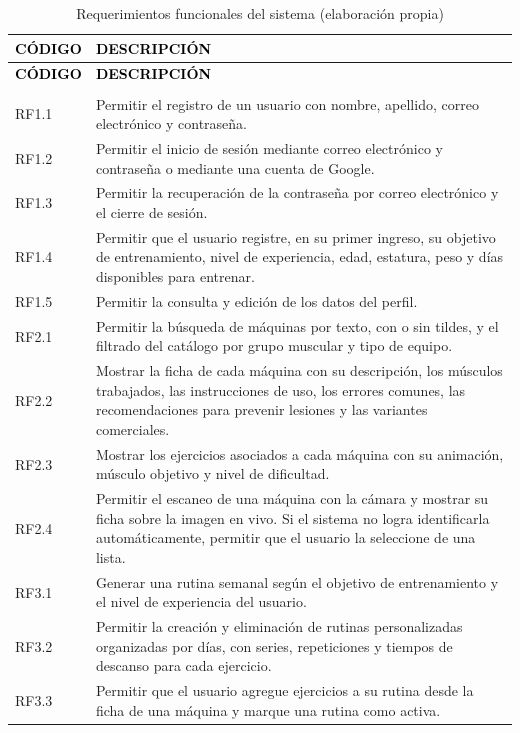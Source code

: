 \begin{longtable}{|L{2.2cm}|L{10.8cm}|}
\hline
{}
\textbf{\textcolor{black}{CÓDIGO}} &
\textbf{\textcolor{black}{DESCRIPCIÓN}} \\
\hline
\endfirsthead

\hline
{}
\textbf{\textcolor{black}{CÓDIGO}} &
\textbf{\textcolor{black}{DESCRIPCIÓN}} \\
\hline
\endhead

\endfoot

\caption{Requerimientos funcionales del sistema (elaboración propia)}
\label{tab:rf}\\
\endlastfoot

RF1.1 & Permitir el registro de un usuario con nombre, apellido,
correo electrónico y contraseña. \\
\hline
RF1.2 & Permitir el inicio de sesión mediante correo electrónico y
contraseña o mediante una cuenta de Google. \\
\hline
RF1.3 & Permitir la recuperación de la contraseña por correo
electrónico y el cierre de sesión. \\
\hline
RF1.4 & Permitir que el usuario registre, en su primer ingreso, su
objetivo de entrenamiento, nivel de experiencia, edad, estatura, peso
y días disponibles para entrenar. \\
\hline
RF1.5 & Permitir la consulta y edición de los datos del perfil. \\
\hline

RF2.1 & Permitir la búsqueda de máquinas por texto, con o sin tildes,
y el filtrado del catálogo por grupo muscular y tipo de equipo. \\
\hline
RF2.2 & Mostrar la ficha de cada máquina con su descripción, los
músculos trabajados, las instrucciones de uso, los errores comunes,
las recomendaciones para prevenir lesiones y las variantes comerciales. \\
\hline
RF2.3 & Mostrar los ejercicios asociados a cada máquina con su
animación, músculo objetivo y nivel de dificultad. \\
\hline
RF2.4 & Permitir el escaneo de una máquina con la cámara y mostrar
su ficha sobre la imagen en vivo. Si el sistema no logra identificarla
automáticamente, permitir que el usuario la seleccione de una lista. \\
\hline

RF3.1 & Generar una rutina semanal según el objetivo de entrenamiento
y el nivel de experiencia del usuario. \\
\hline
RF3.2 & Permitir la creación y eliminación de rutinas personalizadas
organizadas por días, con series, repeticiones y tiempos de descanso
para cada ejercicio. \\
\hline
RF3.3 & Permitir que el usuario agregue ejercicios a su rutina desde
la ficha de una máquina y marque una rutina como activa. \\
\hline


\end{longtable}
